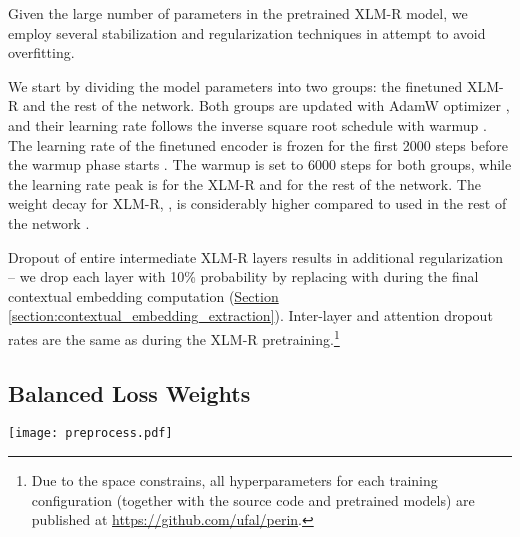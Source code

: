 \documentclass[11pt,a4paper]{article}
\newcommand{\secref}[1]{\hyperref[#1]{Section \ref*{#1}}}
\begin{document}
Given the large number of parameters in the pretrained XLM-R model, we employ several stabilization and regularization techniques in attempt to avoid overfitting.

We start by dividing the model parameters into two groups: the finetuned XLM-R and the rest of the network. Both groups are updated with AdamW optimizer \cite{loshchilov2017decoupled} 
, and their learning rate follows the inverse square root schedule with warmup \cite{vaswani2017attention}.
The learning rate of the finetuned encoder is frozen for the first 2000 steps before the warmup phase starts \cite{howard2018universal}. The warmup is set to 6000 steps for both groups, while the learning rate peak is  for the XLM-R and  for the rest of the network. The weight decay for XLM-R, , is considerably higher compared to  used in the rest of the network \cite{devlin2018bert}.

Dropout of entire intermediate XLM-R layers results in additional regularization -- we drop each layer with 10\% probability by replacing  with  during the final contextual embedding computation (\secref{section:contextual_embedding_extraction}). Inter-layer and attention dropout rates are the same as during the XLM-R pretraining.\hspace{-.08em}\footnote{Due to the space constrains, all hyperparameters for each training configuration (together with the source code and pretrained models) are published at \url{https://github.com/ufal/perin}.} \subsection{Balanced Loss Weights}

\begin{figure*}[t]
\centering
\texttt{[image: preprocess.pdf]}
\caption{Visualization of AMR pre-processing (\secref{sec:amr}) for the sentence \emph{``a crazy comedy duo, those two''}. The original graph is on the left and the transformed graph is shown on the right. Notice that the property \texttt{quant:2} of \texttt{person} is converted into a standalone node. The graph is normalized by reversing three inverted edges (note that \texttt{mod} is in fact \texttt{domain-of}) and some nodes get artificial anchors. Relative encoding rules are not included in this illustration for the sake of clarity, but it is worthwhile noting that nodes \texttt{person} and \texttt{that} contain only absolute label rules and are therefore not anchored.}
\label{fig:preprocess}
\end{figure*}
\end{document}
